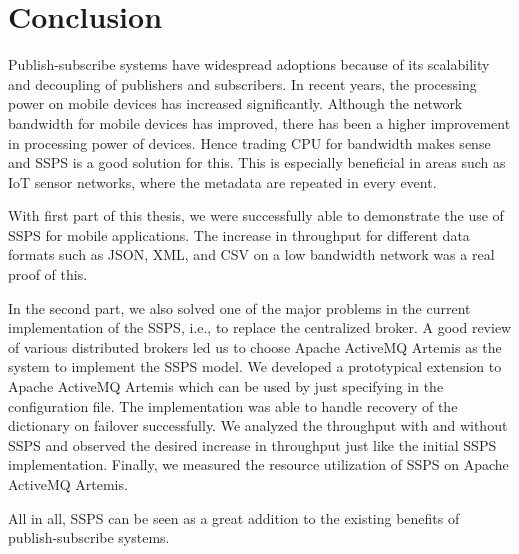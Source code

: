 \chapter{Conclusion}\label{chapter:conclusion}

Publish-subscribe systems have widespread adoptions because of its scalability and decoupling of publishers and subscribers. In recent years, the processing power on mobile devices has increased significantly. Although the network bandwidth for mobile devices has improved, there has been a higher improvement in processing power of devices. Hence trading CPU for bandwidth makes sense and SSPS is a good solution for this. This is especially beneficial in areas such as IoT sensor networks, where the metadata are repeated in every event. 

With first part of this thesis, we were successfully able to demonstrate the use of SSPS for mobile applications. The increase in throughput for different data formats such as JSON, XML, and CSV on a low bandwidth network was a real proof of this. 

In the second part, we also solved one of the major problems in the current implementation of the SSPS, i.e., to replace the centralized broker. A good review of various distributed brokers led us to choose Apache ActiveMQ Artemis as the system to implement the SSPS model. We developed a prototypical extension to Apache ActiveMQ Artemis which can be used by just specifying in the configuration file. The implementation was able to handle recovery of the dictionary on failover successfully. We analyzed the throughput with and without SSPS and observed the desired increase in throughput just like the initial SSPS implementation. Finally, we measured the resource utilization of SSPS on Apache ActiveMQ Artemis.

All in all, SSPS can be seen as a great addition to the existing benefits of publish-subscribe systems.